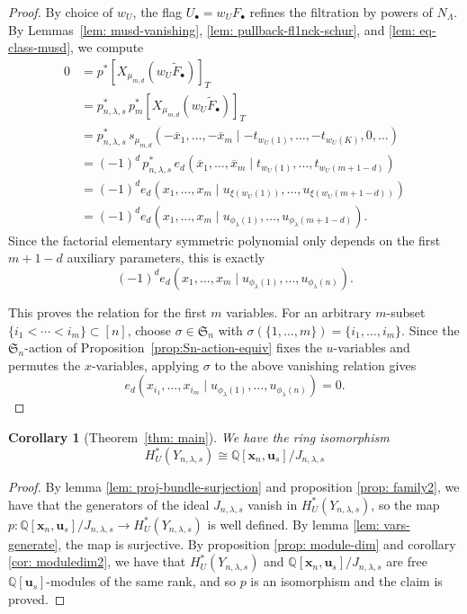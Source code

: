 \documentclass[11pt]{amsart}
\numberwithin{equation}{section}
\newtheorem{corollary}[theorem]{Corollary}
\theoremstyle{definition}
\newcommand{\symm}{{\mathfrak{S}}}
\newcommand{\QQ}{{\mathbb{Q}}}
\newcommand{\xxx}{{\mathbf{x}}}
\newcommand{\uuu}{{\mathbf{u}}}
\begin{document}
\begin{proof}
    By choice of $w_U$, the flag $U_\bullet=w_UF_\bullet$ refines the filtration
    by powers of $N_\Lambda$. By Lemmas~\ref{lem: musd-vanishing},
    \ref{lem: pullback-fl1nck-schur}, and \ref{lem: eq-class-musd}, we compute
    \begin{align*}
        0
        &=p^*[X_{\mu_{m,d}}(w_U\widetilde{F}_\bullet)]_T \\
        &=p_{n,\lambda,s}^*\,p_m^*[X_{\mu_{m,d}}(w_U\widetilde{F}_\bullet)]_T \\
        &=p_{n,\lambda,s}^*\,s_{\mu_{m,d}}(-\overline{x}_1,\dots,-\overline{x}_m
        \mid -t_{w_U(1)},\dots,-t_{w_U(K)},0,\dots) \\
        &=(-1)^d\,p_{n,\lambda,s}^*\,e_d(\overline{x}_1,\dots,\overline{x}_m
        \mid t_{w_U(1)},\dots,t_{w_U(m+1-d)}) \\
        &=(-1)^d e_d(x_1,\dots,x_m\mid u_{\xi(w_U(1))},\dots,u_{\xi(w_U(m+1-d))}) \\
        &=(-1)^d e_d(x_1,\dots,x_m\mid u_{\phi_\lambda(1)},\dots,u_{\phi_\lambda(m+1-d)}).
    \end{align*}
    Since the factorial elementary symmetric polynomial only depends on the
    first $m+1-d$ auxiliary parameters, this is exactly
    \[
    (-1)^d e_d(x_1,\dots,x_m\mid u_{\phi_\lambda(1)},\dots,u_{\phi_\lambda(n)}).
    \]

    This proves the relation for the first $m$ variables. For an arbitrary
    $m$-subset $\{i_1<\cdots<i_m\}\subset [n]$, choose
    $\sigma\in \symm_n$ with $\sigma(\{1,\dots,m\})=\{i_1,\dots,i_m\}$. Since
    the $\symm_n$-action of Proposition~\ref{prop:Sn-action-equiv} fixes the
    $u$-variables and permutes the $x$-variables, applying $\sigma$ to the above
    vanishing relation gives
    \[
    e_d(x_{i_1},\dots,x_{i_m}\mid u_{\phi_\lambda(1)},\dots,u_{\phi_\lambda(n)})=0.
    \]
\end{proof}

\begin{corollary}[Theorem~\ref{thm: main}]
    We have the ring isomorphism
    \begin{equation}
        H^*_U(Y_{n,\lambda,s}) \cong \QQ[\xxx_n,\uuu_s]/J_{n,\lambda,s}
    \end{equation}
\end{corollary}

\begin{proof}
    By lemma \ref{lem: proj-bundle-surjection} and proposition \ref{prop: family2}, we have that the generators of the ideal $J_{n,\lambda,s}$ vanish in $H_U^*(Y_{n,\lambda,s})$, so the map $p: \QQ[\xxx_n,\uuu_s]/J_{n,\lambda,s} \to H^*_U(Y_{n,\lambda,s})$ is well defined. By lemma \ref{lem: vars-generate}, the map is surjective. By proposition \ref{prop: module-dim} and corollary \ref{cor: moduledim2}, we have that $H^*_U(Y_{n,\lambda,s})$ and $\QQ[\xxx_n,\uuu_s]/J_{n,\lambda,s}$ are free $\QQ[\uuu_s]$-modules of the same rank, and so $p$ is an isomorphism and the claim is proved.
\end{proof}
\end{document}
